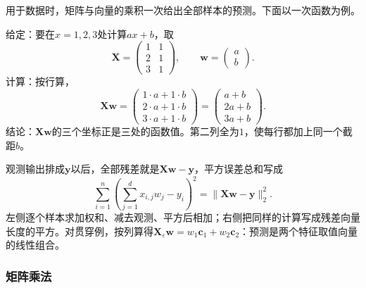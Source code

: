 用于数据时，矩阵与向量的乘积一次给出全部样本的预测。下面以一次函数为例。
\begin{example}[用矩阵与向量的乘积计算一次函数的取值]
\label{ex:ls-affine-predictions}
给定：要在$x=1,2,3$处计算$ax+b$，取
\[
 \bm X=\begin{pmatrix}1&1\\2&1\\3&1\end{pmatrix},\qquad
 \bm w=\begin{pmatrix}a\\b\end{pmatrix}.
\]
计算：按行算，
\[
 \bm X\bm w=\begin{pmatrix}1\cdot a+1\cdot b\\2\cdot a+1\cdot b\\3\cdot a+1\cdot b\end{pmatrix}=\begin{pmatrix}a+b\\2a+b\\3a+b\end{pmatrix}.
\]
结论：$\bm X\bm w$的三个坐标正是三处的函数值。第二列全为$1$，使每行都加上同一个截距$b$。
\end{example}

观测输出排成$\bm y$以后，全部残差就是$\bm X\bm w-\bm y$，平方误差总和写成
\[
 \sum_{i=1}^n\left(\sum_{j=1}^d x_{i,j}w_j-y_i\right)^2
 =\lVert\bm X\bm w-\bm y\rVert_2^2.
\]
左侧逐个样本求加权和、减去观测、平方后相加；右侧把同样的计算写成残差向量长度的平方。对贯穿例，按列算得$\bm X_\varepsilon\bm w=w_1\bm c_1+w_2\bm c_2$：预测是两个特征取值向量的线性组合。

\subsubsection{矩阵乘法}
\label{sec:prelim-linear-actions-composition}

